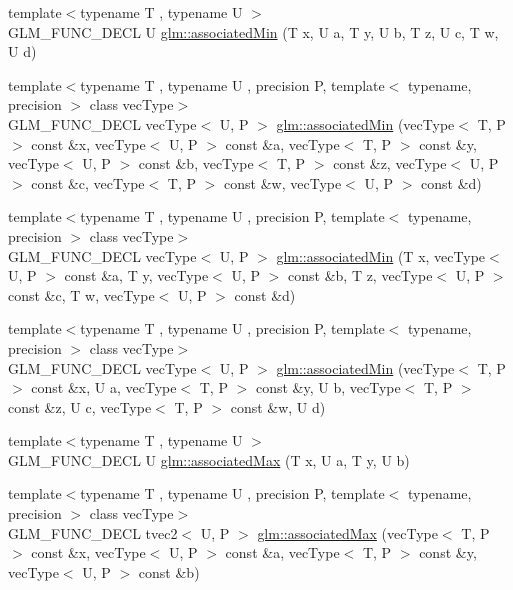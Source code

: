 \begin{DoxyCompactItemize}
\item 
{\footnotesize template$<$typename T , typename U $>$ }\\G\+L\+M\+\_\+\+F\+U\+N\+C\+\_\+\+D\+E\+C\+L U \hyperlink{group__gtx__associated__min__max_ga432224ebe2085eaa2b63a077ecbbbff6}{glm\+::associated\+Min} (T x, U a, T y, U b, T z, U c, T w, U d)
\item 
{\footnotesize template$<$typename T , typename U , precision P, template$<$ typename, precision $>$ class vec\+Type$>$ }\\G\+L\+M\+\_\+\+F\+U\+N\+C\+\_\+\+D\+E\+C\+L vec\+Type$<$ U, P $>$ \hyperlink{group__gtx__associated__min__max_ga88e031f22b80215505928900d3dde549}{glm\+::associated\+Min} (vec\+Type$<$ T, P $>$ const \&x, vec\+Type$<$ U, P $>$ const \&a, vec\+Type$<$ T, P $>$ const \&y, vec\+Type$<$ U, P $>$ const \&b, vec\+Type$<$ T, P $>$ const \&z, vec\+Type$<$ U, P $>$ const \&c, vec\+Type$<$ T, P $>$ const \&w, vec\+Type$<$ U, P $>$ const \&d)
\item 
{\footnotesize template$<$typename T , typename U , precision P, template$<$ typename, precision $>$ class vec\+Type$>$ }\\G\+L\+M\+\_\+\+F\+U\+N\+C\+\_\+\+D\+E\+C\+L vec\+Type$<$ U, P $>$ \hyperlink{group__gtx__associated__min__max_ga0f63b0dce5a5c3242cc6d9847e7d14f1}{glm\+::associated\+Min} (T x, vec\+Type$<$ U, P $>$ const \&a, T y, vec\+Type$<$ U, P $>$ const \&b, T z, vec\+Type$<$ U, P $>$ const \&c, T w, vec\+Type$<$ U, P $>$ const \&d)
\item 
{\footnotesize template$<$typename T , typename U , precision P, template$<$ typename, precision $>$ class vec\+Type$>$ }\\G\+L\+M\+\_\+\+F\+U\+N\+C\+\_\+\+D\+E\+C\+L vec\+Type$<$ U, P $>$ \hyperlink{group__gtx__associated__min__max_ga00a949fd345f4b31b259f033d3ab4a1c}{glm\+::associated\+Min} (vec\+Type$<$ T, P $>$ const \&x, U a, vec\+Type$<$ T, P $>$ const \&y, U b, vec\+Type$<$ T, P $>$ const \&z, U c, vec\+Type$<$ T, P $>$ const \&w, U d)
\item 
{\footnotesize template$<$typename T , typename U $>$ }\\G\+L\+M\+\_\+\+F\+U\+N\+C\+\_\+\+D\+E\+C\+L U \hyperlink{group__gtx__associated__min__max_ga7d9c8785230c8db60f72ec8975f1ba45}{glm\+::associated\+Max} (T x, U a, T y, U b)
\item 
{\footnotesize template$<$typename T , typename U , precision P, template$<$ typename, precision $>$ class vec\+Type$>$ }\\G\+L\+M\+\_\+\+F\+U\+N\+C\+\_\+\+D\+E\+C\+L tvec2$<$ U, P $>$ \hyperlink{group__gtx__associated__min__max_ga10ba6001798f42a0f941f19ff30e066a}{glm\+::associated\+Max} (vec\+Type$<$ T, P $>$ const \&x, vec\+Type$<$ U, P $>$ const \&a, vec\+Type$<$ T, P $>$ const \&y, vec\+Type$<$ U, P $>$ const \&b)

\end{DoxyCompactItemize}
